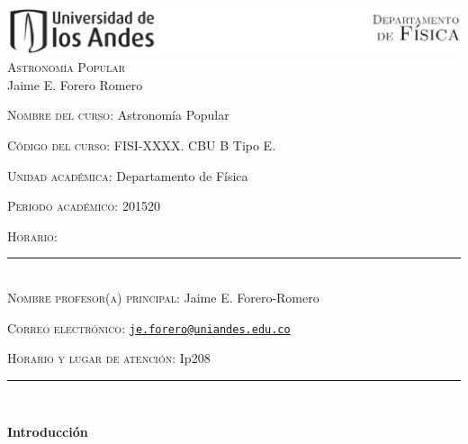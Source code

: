 \documentclass[letterpaper,10pt,onecolumn]{article}
\begin{document}
\begin{center}

\includegraphics[width=490pt]{header.png}\\[0.5cm]

\textsc{\LARGE Astronom\'ia Popular}\\[0.1cm]

\large Jaime E. Forero Romero\\[0.5cm]

\end{center}

\large \noindent\textsc{Nombre del curso:} Astronom\'ia Popular %
 
\noindent\textsc{C\'odigo del curso:} FISI-XXXX. CBU B Tipo E.


\noindent\textsc{Unidad acad\'emica:} Departamento de F\'isica 

\noindent\textsc{Periodo acad\'emico:} 201520 %

\noindent\textsc{Horario:} %

\noindent\rule{\textwidth}{1pt}\\[-0.3cm]

\normalsize \noindent\textsc{Nombre profesor(a) principal:} Jaime
E. Forero-Romero %

\noindent\textsc{Correo electr\'onico:}
\href{mailto:je.forero@uniandes.edu.co}{\nolinkurl{je.forero@uniandes.edu.co}}

\noindent\textsc{Horario y lugar de atenci\'on:} Ip208 %
\\[-0.1cm]


\noindent\rule{\textwidth}{1pt}\\[-0.1cm]

\addtocounter{mysection}{1}

\noindent\textbf{\large {} \quad
  Introducci\'on}\\[-0.2cm] 
\end{document}

